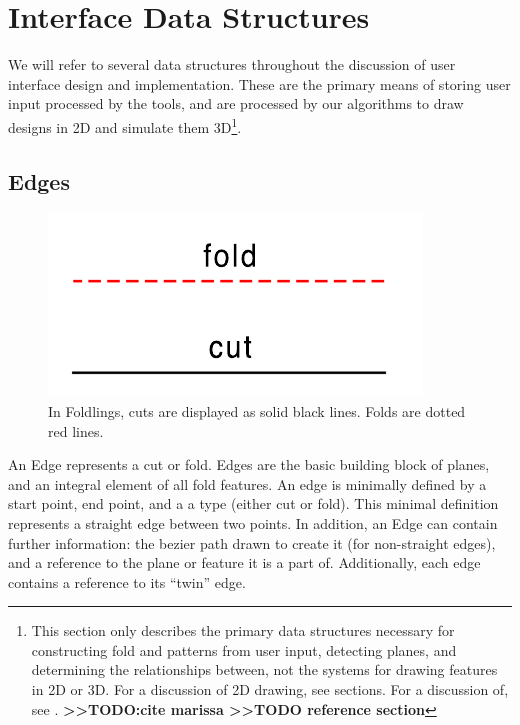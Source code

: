\section{Interface Data Structures}\label{interface-data-structures}

We will refer to several data structures throughout the discussion of
user interface design and implementation. These are the primary means of
storing user input processed by the tools, and are processed by our
algorithms to draw designs in 2D and simulate them 3D\footnote{This
  section only describes the primary data structures necessary for
  constructing fold and patterns from user input, detecting planes, and
  determining the relationships between, not the systems for drawing
  features in 2D or 3D. For a discussion of 2D drawing, see sections.
  For a discussion of, see .
  \textbf{\textgreater{}\textgreater{}TODO:cite marissa
  \textgreater{}\textgreater{}TODO reference section}}.

\subsection{Edges}\label{edges}

\begin{figure}[htbp]
\centering
\includegraphics{figures/33_UI_Interface_Data_Structures/foldvsedge.pdf}
\caption{In Foldlings, cuts are displayed as solid black lines. Folds
are dotted red lines.}
\end{figure}

An Edge represents a cut or fold. Edges are the basic building block of
planes, and an integral element of all fold features. An edge is
minimally defined by a start point, end point, and a a type (either cut
or fold). This minimal definition represents a straight edge between two
points. In addition, an Edge can contain further information: the bezier
path drawn to create it (for non-straight edges), and a reference to the
plane or feature it is a part of. Additionally, each edge contains a
reference to its ``twin'' edge.

